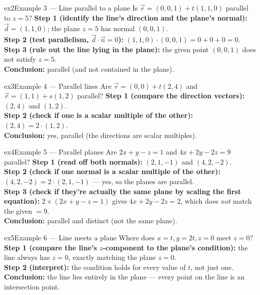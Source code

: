 \documentclass[11pt]{article}
\begin{document}
\begin{example}{ex2}{Example 3 --- Line parallel to a plane}
Is $\vec r=(0,0,1)+t(1,1,0)$ parallel to $z=5$?\soln
\textbf{Step 1 (identify the line's direction and the plane's normal):} $\vec d=(1,1,0)$; the plane $z=5$ has normal $(0,0,1)$.\\[3pt]
\textbf{Step 2 (test parallelism, $\vec d\cdot\vec n=0$):} $(1,1,0)\cdot(0,0,1)=0+0+0=0$.\\[3pt]
\textbf{Step 3 (rule out the line lying in the plane):} the given point $(0,0,1)$ does not satisfy $z=5$.\\[3pt]
\textbf{Conclusion:} parallel (and not contained in the plane).
\end{example}

\begin{example}{ex3}{Example 4 --- Parallel lines}
Are $\vec r=(0,0)+t(2,4)$ and $\vec r=(1,1)+s(1,2)$ parallel?\soln
\textbf{Step 1 (compare the direction vectors):} $(2,4)$ and $(1,2)$.\\[3pt]
\textbf{Step 2 (check if one is a scalar multiple of the other):} $(2,4)=2\cdot(1,2)$.\\[3pt]
\textbf{Conclusion:} yes, parallel (the directions are scalar multiples).
\end{example}

\begin{example}{ex4}{Example 5 --- Parallel planes}
Are $2x+y-z=1$ and $4x+2y-2z=9$ parallel?\soln
\textbf{Step 1 (read off both normals):} $(2,1,-1)$ and $(4,2,-2)$.\\[3pt]
\textbf{Step 2 (check if one normal is a scalar multiple of the other):} $(4,2,-2)=2\cdot(2,1,-1)$ --- yes, so the planes are parallel.\\[3pt]
\textbf{Step 3 (check if they're actually the same plane by scaling the first equation):} $2\times(2x+y-z=1)$ gives $4x+2y-2z=2$, which does \emph{not} match the given $=9$.\\[3pt]
\textbf{Conclusion:} parallel and distinct (not the same plane).
\end{example}

\begin{example}{ex5}{Example 6 --- Line meets a plane}
Where does $x=t,y=2t,z=0$ meet $z=0$?\soln
\textbf{Step 1 (compare the line's $z$-component to the plane's condition):} the line always has $z=0$, exactly matching the plane $z=0$.\\[3pt]
\textbf{Step 2 (interpret):} the condition holds for every value of $t$, not just one.\\[3pt]
\textbf{Conclusion:} the line lies entirely in the plane --- every point on the line is an intersection point.
\end{example}
\end{document}

